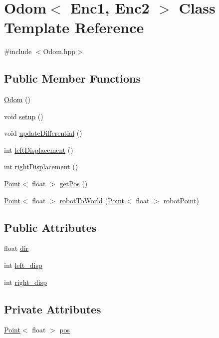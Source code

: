 \hypertarget{classOdom}{\section{Odom$<$ Enc1, Enc2 $>$ Class Template Reference}
\label{classOdom}
}


{\ttfamily \#include $<$Odom.\-hpp$>$}

\subsection*{Public Member Functions}
\begin{DoxyCompactItemize}
\item 
\hyperlink{classOdom_ab45cc0ea11f5300b84afe6133859a2c2}{Odom} ()
\item 
void \hyperlink{classOdom_a6736e8d83d7276bc7b4a656b9dc8dda5}{setup} ()
\item 
void \hyperlink{classOdom_ab8bfe47ce84b923b09abf1cf4428c516}{update\-Differential} ()
\item 
int \hyperlink{classOdom_aad18072b90a4f0951165577a014024de}{left\-Displacement} ()
\item 
int \hyperlink{classOdom_aee42d44f07335600703f40061a01836e}{right\-Displacement} ()
\item 
\hyperlink{classPoint}{Point}$<$ float $>$ \hyperlink{classOdom_adf58a66718029d08c7bd47d5cebfefb6}{get\-Pos} ()
\item 
\hyperlink{classPoint}{Point}$<$ float $>$ \hyperlink{classOdom_a07f630244bd18439ab5e057dfab0587f}{robot\-To\-World} (\hyperlink{classPoint}{Point}$<$ float $>$ robot\-Point)
\end{DoxyCompactItemize}
\subsection*{Public Attributes}
\begin{DoxyCompactItemize}
\item 
float \hyperlink{classOdom_ad2308d2e662650534d2a85aad6c97349}{dir}
\item 
int \hyperlink{classOdom_aa29154456ebb189815df2501cc8eb2fd}{left\-\_\-disp}
\item 
int \hyperlink{classOdom_a967a8ce7e6bea53de203e37cf180389a}{right\-\_\-disp}
\end{DoxyCompactItemize}
\subsection*{Private Attributes}
\begin{DoxyCompactItemize}
\item 
\hyperlink{classPoint}{Point}$<$ float $>$ \hyperlink{classOdom_a0e43d9feb433dec91e7a08cee64d732b}{pos}
\end{DoxyCompactItemize}
